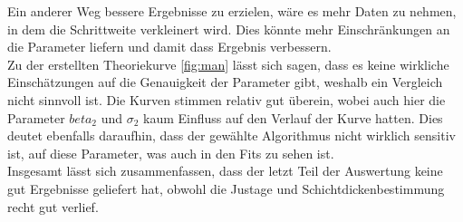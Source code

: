 Ein anderer Weg bessere Ergebnisse zu erzielen, wäre es mehr Daten zu nehmen, in dem die Schrittweite verkleinert wird. Dies könnte mehr Einschränkungen an die Parameter liefern und damit dass Ergebnis verbessern. \\
Zu der erstellten Theoriekurve \ref{fig:man} lässt sich sagen, dass es keine wirkliche Einschätzungen auf die Genauigkeit der Parameter gibt, weshalb ein Vergleich nicht sinnvoll ist. Die Kurven stimmen relativ gut überein, wobei auch hier die Parameter $beta_2$ und $\sigma_2$ kaum Einfluss auf den Verlauf der Kurve hatten. Dies deutet ebenfalls daraufhin, dass der gewählte Algorithmus nicht wirklich sensitiv ist, auf diese Parameter, was auch in den Fits zu sehen ist.\\  
Insgesamt lässt sich zusammenfassen, dass der letzt Teil der Auswertung keine gut Ergebnisse geliefert hat, obwohl die Justage und Schichtdickenbestimmung recht gut verlief.
